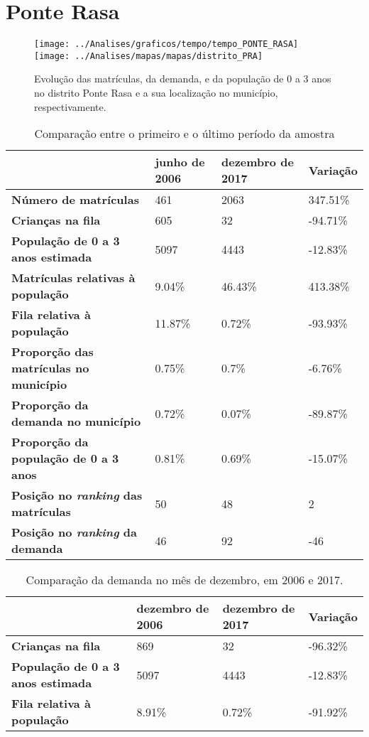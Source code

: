 \section{Ponte Rasa}
\begin{figure}[H]
\centering
\texttt{[image: ../Analises/graficos/tempo/tempo\_PONTE\_RASA]}
\texttt{[image: ../Analises/mapas/mapas/distrito\_PRA]}
\caption{Evolução das matrículas, da demanda, e da população de 0 a 3 anos no distrito Ponte Rasa e a sua localização no município, respectivamente.}
\end{figure}
\begin{table}[H]
\begin{tabular}{l|l|l|l}
\textbf{}                                      & \textbf{junho de 2006}       & \textbf{dezembro de 2017}    & \textbf{Variação} \\ \hline
\textbf{Número de matrículas}                  & 461 & 2063 & 347.51\% \\ \hline
\textbf{Crianças na fila}                      & 605 & 32 & -94.71\% \\ \hline
\textbf{População de 0 a 3 anos estimada}      & 5097 & 4443 & -12.83\% \\ \hline
\textbf{Matrículas relativas à população}      & 9.04\% & 46.43\% & 413.38\% \\ \hline
\textbf{Fila relativa à população}             & 11.87\% & 0.72\% & -93.93\% \\ \hline
\textbf{Proporção das matrículas no município} & 0.75\% & 0.7\% & -6.76\% \\ \hline
\textbf{Proporção da demanda no município}     & 0.72\% & 0.07\% & -89.87\% \\ \hline
\textbf{Proporção da população de 0 a 3 anos}  & 0.81\% & 0.69\% & -15.07\% \\ \hline
\textbf{Posição no \textit{ranking} das matrículas}     & 50 & 48 & 2 \\ \hline
\textbf{Posição no \textit{ranking} da demanda}         & 46 & 92 & -46 \\ 
\end{tabular}
\caption{Comparação entre o primeiro e o último período da amostra}
\end{table}
\begin{table}[H]
\begin{tabular}{l|l|l|l}
\textbf{}                                 & \textbf{dezembro de 2006} & \textbf{dezembro de 2017} & \textbf{Variação} \\ \hline
\textbf{Crianças na fila}                      & 869 & 32 & -96.32\% \\ \hline
\textbf{População de 0 a 3 anos estimada}      & 5097 & 4443 & -12.83\% \\ \hline
\textbf{Fila relativa à população}             & 8.91\% & 0.72\% & -91.92\% \\
\end{tabular}
\caption{Comparação da demanda no mês de dezembro, em 2006 e 2017.}
\end{table}
